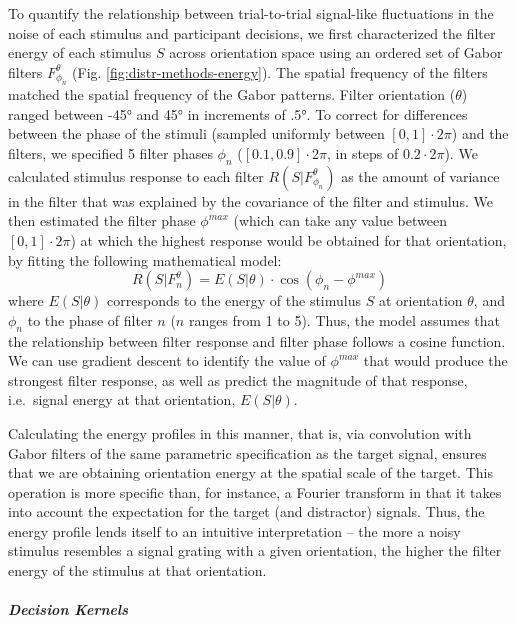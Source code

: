 \documentclass[a4paper, nobind]{templates/ociamthesis}
\begin{document}
To quantify the relationship between trial-to-trial signal-like fluctuations in the noise of each stimulus and participant decisions, we first characterized the filter energy of each stimulus \(S\) across orientation space using an ordered set of Gabor filters \(F^{\theta}_{\phi_n}\) (Fig. \ref{fig:distr-methods-energy}). The spatial frequency of the filters matched the spatial frequency of the Gabor patterns. Filter orientation (\({\theta}\)) ranged between -45° and 45° in increments of .5°. To correct for differences between the phase of the stimuli (sampled uniformly between \([0,1] \cdot 2\pi\)) and the filters, we specified 5 filter phases \({\phi_n}\) (\([0.1,0.9] \cdot 2\pi\), in steps of \(0.2 \cdot 2\pi\)). We calculated stimulus response to each filter \(R(S|F^{\theta}_{\phi_n})\) as the amount of variance in the filter that was explained by the covariance of the filter and stimulus. We then estimated the filter phase \(\phi^{max}\) (which can take any value between \([0,1] \cdot 2\pi\)) at which the highest response would be obtained for that orientation, by fitting the following mathematical model:
\begin{equation}
R(S|F_n^{\theta}) = E(S|\theta) \cdot \cos(\phi_n - \phi^{max})
\end{equation}
where \(E(S|\theta)\) corresponds to the energy of the stimulus \(S\) at orientation \(\theta\), and \(\phi_n\) to the phase of filter \(n\) (\(n\) ranges from 1 to 5). Thus, the model assumes that the relationship between filter response and filter phase follows a cosine function. We can use gradient descent to identify the value of \(\phi^{max}\) that would produce the strongest filter response, as well as predict the magnitude of that response, i.e.~signal energy at that orientation, \(E(S|\theta)\).

Calculating the energy profiles in this manner, that is, via convolution with Gabor filters of the same parametric specification as the target signal, ensures that we are obtaining orientation energy at the spatial scale of the target. This operation is more specific than, for instance, a Fourier transform in that it takes into account the expectation for the target (and distractor) signals. Thus, the energy profile lends itself to an intuitive interpretation -- the more a noisy stimulus resembles a signal grating with a given orientation, the higher the filter energy of the stimulus at that orientation.

\hypertarget{decision-kernels}{%
\subparagraph{Decision Kernels}\label{decision-kernels}}
\end{document}
